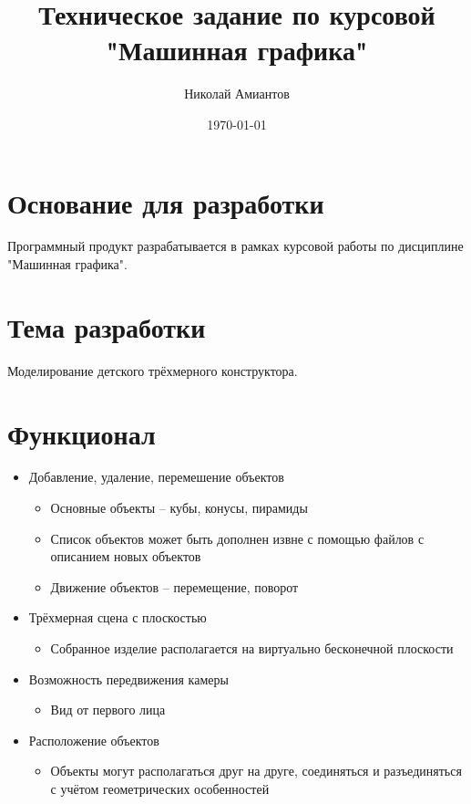 \documentclass[a4paper,12pt]{article}
\title{Техническое задание по курсовой "Машинная графика"}
\author{Николай Амиантов}
\date{\today}
\begin{document}
\section{Основание для разработки}

Программный продукт разрабатывается в рамках курсовой работы по дисциплине "Машинная графика".

\section{Тема разработки}

Моделирование детского трёхмерного конструктора.

\section{Функционал}
\begin{itemize}
  \item Добавление, удаление, перемешение объектов
  \begin{itemize}
    \item Основные объекты -- кубы, конусы, пирамиды
    \item Список объектов может быть дополнен извне с помощью файлов с описанием новых объектов
    \item Движение объектов -- перемещение, поворот
  \end{itemize}
  \item Трёхмерная сцена с плоскостью
  \begin{itemize}
    \item Собранное изделие располагается на виртуально бесконечной плоскости
  \end{itemize}
  \item Возможность передвижения камеры
  \begin{itemize}
    \item Вид от первого лица
  \end{itemize}
  \item Расположение объектов
  \begin{itemize}
    \item Объекты могут располагаться друг на друге, соединяться и разъединяться с учётом геометрических особенностей
  \end{itemize}
\end{itemize}
\end{document}
